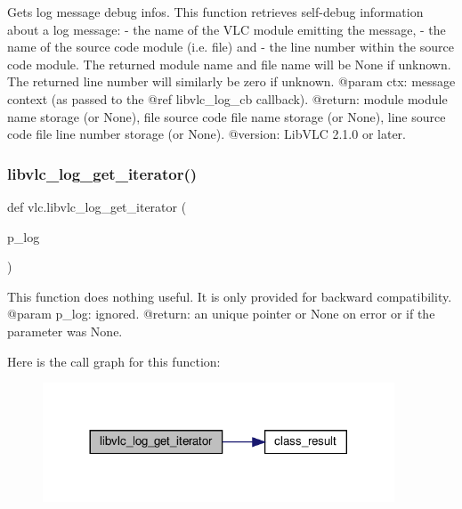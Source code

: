 \begin{DoxyVerb}Gets log message debug infos.
This function retrieves self-debug information about a log message:
- the name of the VLC module emitting the message,
- the name of the source code module (i.e. file) and
- the line number within the source code module.
The returned module name and file name will be None if unknown.
The returned line number will similarly be zero if unknown.
@param ctx: message context (as passed to the @ref libvlc_log_cb callback).
@return: module module name storage (or None), file source code file name storage (or None), line source code file line number storage (or None).
@version: LibVLC 2.1.0 or later.
\end{DoxyVerb}
 \mbox{\label{namespacevlc_acc5cfe5868875686d30894d6a631b517}} 
\subsubsection{\texorpdfstring{libvlc\+\_\+log\+\_\+get\+\_\+iterator()}{libvlc\_log\_get\_iterator()}}
{\footnotesize\ttfamily def vlc.\+libvlc\+\_\+log\+\_\+get\+\_\+iterator (\begin{DoxyParamCaption}\item[{}]{p\+\_\+log }\end{DoxyParamCaption})}

\begin{DoxyVerb}This function does nothing useful.
It is only provided for backward compatibility.
@param p_log: ignored.
@return: an unique pointer or None on error or if the parameter was None.
\end{DoxyVerb}
 Here is the call graph for this function\+:
\nopagebreak
\begin{figure}[H]
\begin{center}
\leavevmode
\includegraphics[width=296pt]{namespacevlc_acc5cfe5868875686d30894d6a631b517_cgraph}
\end{center}
\end{figure}
\mbox{\label{namespacevlc_ac7af2ab7238d542708ec0da84c3d3a71}} 
